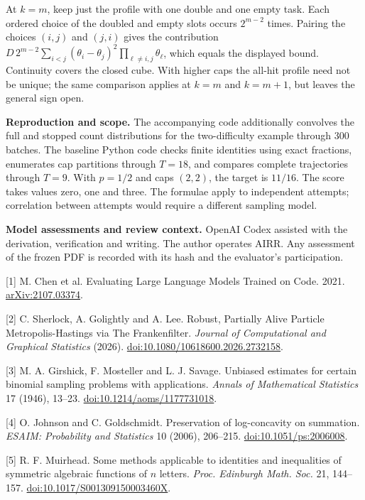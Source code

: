 \documentclass[11pt]{article}
\begin{document}
At $k=m$, keep just the profile with one double and one empty task. Each ordered choice of the doubled and empty slots occurs $2^{m-2}$ times. Pairing the choices $(i,j)$ and $(j,i)$ gives the contribution $D\,2^{m-2}\sum_{i<j}(\theta_i-\theta_j)^2\prod_{\ell\ne i,j}\theta_\ell$, which equals the displayed bound. Continuity covers the closed cube. With higher caps the all-hit profile need not be unique; the same comparison applies at $k=m$ and $k=m+1$, but leaves the general sign open.

\textbf{Reproduction and scope.} The accompanying code additionally convolves the full and stopped count distributions for the two-difficulty example through 300 batches. The baseline Python code checks finite identities using exact fractions, enumerates cap partitions through $T=18$, and compares complete trajectories through $T=9$. With $p=1/2$ and caps $(2,2)$, the target is $11/16$. The score takes values zero, one and three. The formulae apply to independent attempts; correlation between attempts would require a different sampling model.

\textbf{Model assessments and review context.} OpenAI Codex assisted with the derivation, verification and writing. The author operates AIRR. Any assessment of the frozen PDF is recorded with its hash and the evaluator's participation.

\small
[1] M. Chen et al. Evaluating Large Language Models Trained on Code. 2021. \href{https://arxiv.org/abs/2107.03374}{arXiv:2107.03374}.

[2] C. Sherlock, A. Golightly and A. Lee. Robust, Partially Alive Particle Metropolis-Hastings via The Frankenfilter. \emph{Journal of Computational and Graphical Statistics} (2026). \href{https://doi.org/10.1080/10618600.2026.2732158}{doi:10.1080/10618600.2026.2732158}.

[3] M. A. Girshick, F. Mosteller and L. J. Savage. Unbiased estimates for certain binomial sampling problems with applications. \emph{Annals of Mathematical Statistics} 17 (1946), 13--23. \href{https://doi.org/10.1214/aoms/1177731018}{doi:10.1214/aoms/1177731018}.

[4] O. Johnson and C. Goldschmidt. Preservation of log-concavity on summation. \emph{ESAIM: Probability and Statistics} 10 (2006), 206--215. \href{https://doi.org/10.1051/ps:2006008}{doi:10.1051/ps:2006008}.

[5] R. F. Muirhead. Some methods applicable to identities and inequalities of symmetric algebraic functions of $n$ letters. \emph{Proc. Edinburgh Math. Soc.} 21, 144--157. \href{https://doi.org/10.1017/S001309150003460X}{doi:10.1017/S001309150003460X}.
\end{document}
